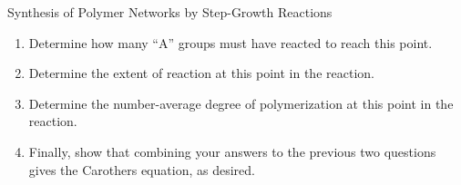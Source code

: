 \begin{activity}[extension]{Synthesis of Polymer Networks by Step-Growth Reactions}
\begin{exercises}
\begin{enumerate}
\begin{solution}
{					(To a first approximation, each bond-forming reaction reduces the number of molecules by one, so if we have dropped from $n_0$ to $n$ molecules, we must have undergone $n_0-n$ bond-forming reactions; while this is not strictly true, since formation of loops and/or other reactions between reactive groups that are already part of the same molecule do not reduce the number of molecules present in the reaction mixture, it is a reasonable approximation especially at low extents of reaction.)
				}\end{solution}
				
			\item Determine how many ``A'' groups must have reacted to reach this point.
			
				\begin{solution}\end{solution}
				
			\item Determine the extent of reaction at this point in the reaction.
			
				\begin{solution}\end{solution}
				
			\item Determine the number-average degree of polymerization at this point in the reaction.
			
				\begin{solution}\end{solution}
				
			\item Finally, show that combining your answers to the previous two questions gives the Carothers equation, as desired.
			

\end{enumerate}
\end{exercises}
\end{activity}
